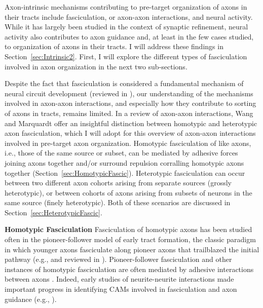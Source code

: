 Axon-intrinsic mechanisms contributing to pre-target organization of axons in their tracts include fasciculation, or axon-axon interactions, and neural activity.
While it has largely been studied in the context of synaptic refinement, neural activity also contributes to axon guidance and, at least in the few cases studied, to organization of axons in their tracts.
I will address these findings in Section~\ref{sec:Intrinsic2}.
First, I will explore the different types of fasciculation involved in axon organization in the next two sub-sections.

Despite the fact that fasciculation is considered a fundamental mechanism of neural circuit development (reviewed in ), our understanding of the mechanisms involved in axon-axon interactions, and especially how they contribute to sorting of axons in tracts, remains limited.
In a review of axon-axon interactions, Wang and Marquardt  offer an insightful distinction between homotypic and heterotypic axon fasciculation, which I will adopt for this overview of axon-axon interactions involved in pre-target axon organization. 
Homotypic fasciculation of like axons, i.e., those of the same source or subset, can be mediated by adhesive forces joining axons together and/or surround repulsion corralling homotypic axons together (Section~\ref{sec:HomotypicFascic}).
Heterotypic fasciculation can occur between two different axon cohorts arising from separate sources (grossly heterotypic), or between cohorts of axons arising from subsets of neurons in the same source (finely heterotypic).
Both of these scenarios are discussed in Section~\ref{sec:HeterotypicFascic}.

\textbf{Homotypic Fasciculation}
\label{sec:HomotypicFascic}
Fasciculation of homotypic axons has been studied often in the pioneer-follower model of early tract formation, the classic paradigm in which younger axons fasciculate along pioneer axons that trailblazed the initial pathway (e.g.,  and reviewed in ).
Pioneer-follower fasciculation and other instances of homotypic fasciculation are often mediated by adhesive interactions between axons \cite{van1998adhesion}.
Indeed, early studies of neurite-neurite interactions made important progress in identifying CAMs involved in fasciculation and axon guidance (e.g., ).


